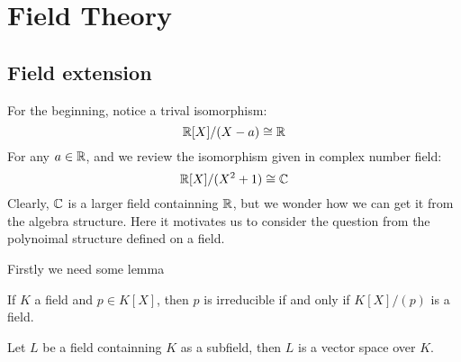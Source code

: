 \documentclass[en,geye,blue,normal,12pt]{elegantnote}
\begin{document}
\section{Field Theory}
\subsection{Field extension}
For the beginning, notice a trival isomorphism:
\[\mathbb{R}[X]/(X-a) \cong \mathbb{R} \]
For any \(a \in \mathbb{R}\), and we review the isomorphism given in complex number field:
\[ \mathbb{R}[X]/ (X^2+1) \cong \mathbb{C}\]
Clearly, \(\mathbb{C}\) is a larger field containning \(\mathbb{R}\), but we wonder how we can get it from the algebra structure. Here it motivates us to consider the question from the polynoimal structure defined on a field.

Firstly we need some lemma
\begin{lemma} \label{irr iff field}
  If \(K\) a field and \(p \in K[X]\), then \(p\) is irreducible if and only if \(K[X]/(p)\) is a field.
\end{lemma}

\begin{lemma}
  Let \(L\) be a field containning \(K\) as a subfield, then \(L\) is a vector space over \(K\).
\end{lemma}
\end{document}
